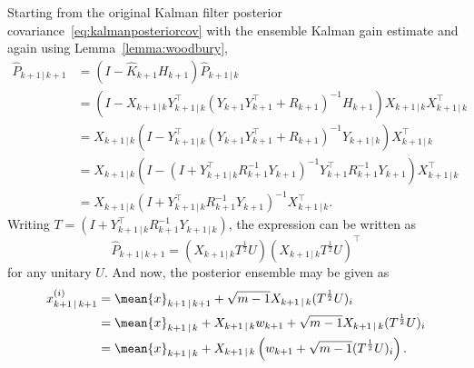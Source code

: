 Starting from the original Kalman filter posterior covariance~\eqref{eq:kalmanposteriorcov} with the ensemble Kalman gain estimate and again using Lemma~\ref{lemma:woodbury},
\begin{subequations}
    \begin{align*}
        \hat{P}_{k+1\,\vert\,k+1} &= (I - \hat{K}_{k+1}H_{k+1}) \hat{P}_{k+1\,\vert\,k}\\
                                  &= \left(I - X_{k+1 \, \vert \, k} Y_{k+1 \, \vert \, k}^{\top} (Y_{k+1} Y_{k+1}^{\top} + R_{k+1})^{-1} H_{k+1}\right) X_{k+1 \, \vert \, k} X_{k+1 \, \vert \, k}^{\top}\\
                                  &= X_{k+1 \, \vert \, k} \left(I - Y_{k+1 \, \vert \, k}^{\top} (Y_{k+1} Y_{k+1}^{\top} + R_{k+1})^{-1} Y_{k+1 \, \vert \, k} \right)  X_{k+1 \, \vert \, k}^{\top}\\
                                  &= X_{k+1 \, \vert \, k} \left(I - (I + Y_{k+1 \, \vert \, k}^{\top} R_{k+1}^{-1} Y_{k+1} )^{-1} Y_{k+1}^{\top} R_{k+1}^{-1} Y_{k+1} \right) X_{k+1 \, \vert \, k}^{\top}\\
                                  &=  X_{k+1 \, \vert \, k} (I + Y_{k+1 \, \vert \, k}^{\top} R_{k+1}^{-1} Y_{k+1} )^{-1} X_{k+1 \, \vert \, k}^{\top}.
    \end{align*}
\end{subequations}
Writing $T = (I + Y_{k+1 \, \vert \, k}^{\top} R_{k+1}^{-1} Y_{k+1 \, \vert \, k})$, the expression can be written as
\begin{equation*}
    \hat{P}_{k+1\,\vert\,k+1} = (X_{k+1 \, \vert \, k} T^{\frac{1}{2}} U)  (X_{k+1 \, \vert \, k} T^{\frac{1}{2}} U)^{\top}
\end{equation*}
for any unitary $U$.
And now, the posterior ensemble may be given as
\begin{align*}
    x_{k+1\,\vert\,k+1}^{(i)} &= \mean{x}_{k+1\,\vert\,k+1} + \sqrt{m-1}  X_{k+1 \, \vert \, k} (T^{\frac{1}{2}} U)_{i}\\
                              &= \mean{x}_{k+1\,\vert\,k} + X_{k+1 \, \vert \, k} w_{k+1} +  \sqrt{m-1}  X_{k+1 \, \vert \, k} (T^{\frac{1}{2}} U)_{i}\\
                              &= \mean{x}_{k+1\,\vert\,k} + X_{k+1 \, \vert \, k} \left( w_{k+1} + \sqrt{m-1} (T^{\frac{1}{2}} U)_{i} \right).
\end{align*}

